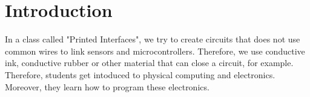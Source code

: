 \documentclass[doc.tex]{subfiles}
\begin{document}
    \section{Introduction}
    \begin{flushleft}
        In a class called "Printed Interfaces", we try to create circuits that does not use common wires 
        to link sensors and microcontrollers. Therefore, we use conductive ink, conductive rubber or other
        material that can close a circuit, for example. Therefore, students get intoduced to physical 
        computing and electronics. Moreover, they learn how to program these electronics. 
    \end{flushleft}
\end{document}
